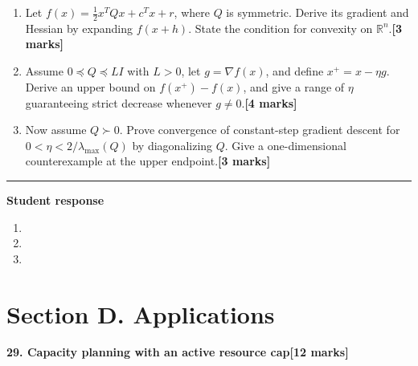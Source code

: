 \documentclass[11pt,a4paper]{article}
\newlength{\BlankAnswerHeight}\setlength{\BlankAnswerHeight}{16mm}
\newcommand{\AnswerBlank}{\leavevmode\par\vspace{\BlankAnswerHeight}}
\begin{document}
\begin{enumerate}[label=(\alph*),leftmargin=8mm,itemsep=3pt]
\item Let \(f(x)=\frac12x^TQx+c^Tx+r\), where \(Q\) is symmetric. Derive its gradient and Hessian by expanding \(f(x+h)\). State the condition for convexity on \(\mathbb R^n\).\hfill\textbf{[3 marks]}
\item Assume \(0\preceq Q\preceq LI\) with \(L>0\), let \(g=\nabla f(x)\), and define \(x^+=x-\eta g\). Derive an upper bound on \(f(x^+)-f(x)\), and give a range of \(\eta\) guaranteeing strict decrease whenever \(g\ne0\).\hfill\textbf{[4 marks]}
\item Now assume \(Q\succ0\). Prove convergence of constant-step gradient descent for \(0<\eta<2/\lambda_{\max}(Q)\) by diagonalizing \(Q\). Give a one-dimensional counterexample at the upper endpoint.\hfill\textbf{[3 marks]}
\end{enumerate}\par\medskip\hrule\medskip\textbf{Student response}\par
\begin{enumerate}[label=(\alph*),leftmargin=8mm,itemsep=3pt]
\item
\AnswerBlank
\item
\AnswerBlank
\item
\AnswerBlank
\end{enumerate}
\newpage\section*{Section D. Applications}
\textbf{29. Capacity planning with an active resource cap}\hfill\textbf{[12 marks]}\par\medskip
\end{document}
